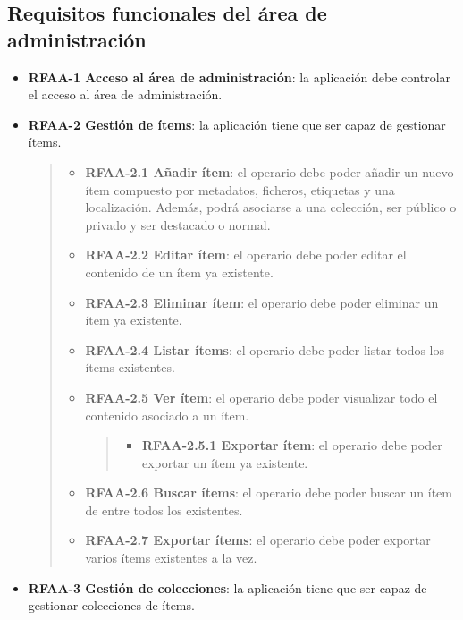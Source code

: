 \subsection{Requisitos funcionales del área de administración}

\begin{itemize}
\item
  \textbf{RFAA-1 Acceso al área de administración}: la aplicación debe
  controlar el acceso al área de administración.
\item
  \textbf{RFAA-2 Gestión de ítems}: la aplicación tiene que ser capaz de
  gestionar ítems.

  \begin{quote}
  \begin{itemize}
  \item
    \textbf{RFAA-2.1 Añadir ítem}: el operario debe poder añadir un
    nuevo ítem compuesto por metadatos, ficheros, etiquetas y una
    localización. Además, podrá asociarse a una colección, ser público o
    privado y ser destacado o normal.
  \item
    \textbf{RFAA-2.2 Editar ítem}: el operario debe poder editar el
    contenido de un ítem ya existente.
  \item
    \textbf{RFAA-2.3 Eliminar ítem}: el operario debe poder eliminar un
    ítem ya existente.
  \item
    \textbf{RFAA-2.4 Listar ítems}: el operario debe poder listar todos
    los ítems existentes.
  \item
    \textbf{RFAA-2.5 Ver ítem}: el operario debe poder visualizar todo
    el contenido asociado a un ítem.

    \begin{quote}
    \begin{itemize}
    \tightlist
    \item
      \textbf{RFAA-2.5.1 Exportar ítem}: el operario debe poder exportar
      un ítem ya existente.
    \end{itemize}
    \end{quote}
  \item
    \textbf{RFAA-2.6 Buscar ítems}: el operario debe poder buscar un
    ítem de entre todos los existentes.
  \item
    \textbf{RFAA-2.7 Exportar ítems}: el operario debe poder exportar
    varios ítems existentes a la vez.
  \end{itemize}
  \end{quote}
\item
  \textbf{RFAA-3 Gestión de colecciones}: la aplicación tiene que ser
  capaz de gestionar colecciones de ítems.


\end{itemize}
